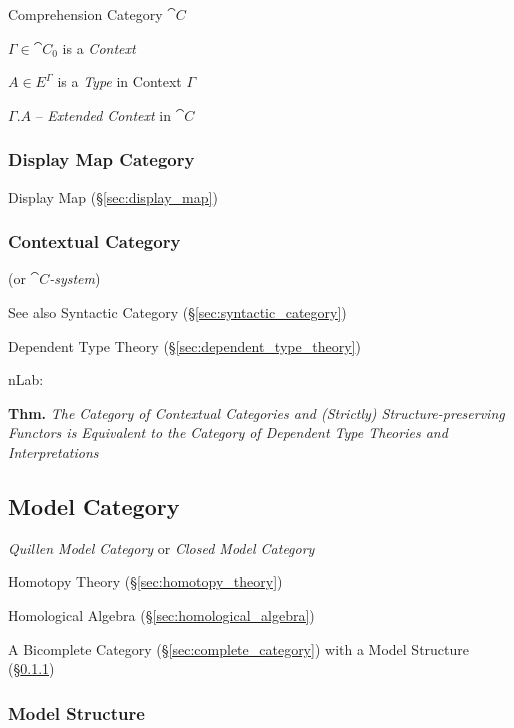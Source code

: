 Comprehension Category $\cat{C}$

$\Gamma \in \cat{C}_0$ is a \emph{Context}

$A \in E^\Gamma$ is a \emph{Type} in Context $\Gamma$

$\Gamma.A$ -- \emph{Extended Context} in $\cat{C}$



\subsubsection{Display Map Category}\label{sec:display_map_category}

Display Map (\S\ref{sec:display_map})



\subsubsection{Contextual Category}\label{sec:contextual_category}

(or \emph{$\cat{C}$-system})

\fist See also Syntactic Category (\S\ref{sec:syntactic_category})

Dependent Type Theory (\S\ref{sec:dependent_type_theory})

nLab:

\textbf{Thm.} \emph{The Category of Contextual Categories and
  (Strictly) Structure-preserving Functors is Equivalent to the
  Category of Dependent Type Theories and Interpretations} %



\subsection{Model Category}\label{sec:model_category}

\emph{Quillen Model Category} or \emph{Closed Model Category}

Homotopy Theory (\S\ref{sec:homotopy_theory})

Homological Algebra (\S\ref{sec:homological_algebra})

A Bicomplete Category (\S\ref{sec:complete_category}) with a Model
Structure (\S\ref{sec:model_structure})



\subsubsection{Model Structure}\label{sec:model_structure}

